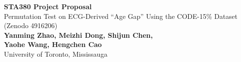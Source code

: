 \documentclass{article}
\begin{document}
	\begin{center}

		\LARGE{\textbf{STA380 Project Proposal}} \\
        \vspace{1em}
        \Large{Permutation Test on ECG-Derived ``Age Gap'' Using the CODE-15\% Dataset (Zenodo 4916206)} \\
        \vspace{1em}
        \normalsize\textbf{Yanming Zhao, Meizhi Dong, Shijun Chen,\\Yaohe Wang, Hengchen Cao} \\
        \vspace{1em}
        \normalsize{University of Toronto, Mississauga}

	\end{center}
\end{document}
